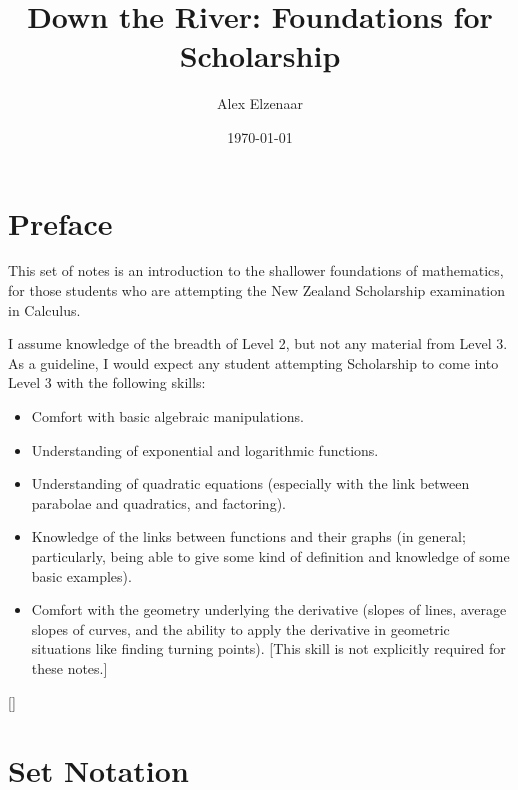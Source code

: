 \documentclass[a4paper,leqno]{article}
\title{Down the River: Foundations for Scholarship}
\author{Alex Elzenaar}
\date{\today}
\numberwithin{equation}{section}
\theoremstyle{definition}
\theoremstyle{remark}
\begin{document}
\maketitle
\tableofcontents
\section*{Preface}
This set of notes is an introduction to the shallower foundations of mathematics, for those students who
are attempting the New Zealand Scholarship examination in Calculus.

I assume knowledge of the breadth of Level 2, but not any material from Level 3. As a guideline, I would
expect any student attempting Scholarship to come into Level 3 with the following skills:
\begin{itemize}
  \item Comfort with basic algebraic manipulations.
  \item Understanding of exponential and logarithmic functions.
  \item Understanding of quadratic equations (especially with the link between parabolae and quadratics, and factoring).
  \item Knowledge of the links between functions and their graphs (in general; particularly, being able to give some kind
        of definition and knowledge of some basic examples).
  \item Comfort with the geometry underlying the derivative (slopes of lines, average slopes of curves, and the ability
        to apply the derivative in geometric situations like finding turning points). [This skill is not explicitly required for these notes.]
\end{itemize}

[{\titlerule[0.8pt]}]
\let\oldsection\section
\renewcommand\section{\clearpage\oldsection}
\section{Set Notation}
\end{document}
